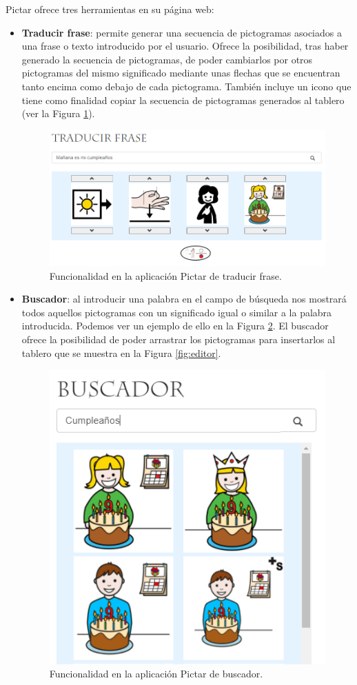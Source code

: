 Pictar ofrece tres herramientas en su página web:
\begin{itemize}
	\item \textbf{Traducir frase}: permite generar una secuencia de pictogramas asociados a una frase o texto introducido por el usuario. Ofrece la posibilidad, tras haber generado la secuencia de pictogramas, de poder cambiarlos por otros pictogramas del mismo significado mediante unas flechas que se encuentran tanto encima como debajo de cada pictograma. También incluye un icono que tiene como finalidad copiar la secuencia de pictogramas generados al tablero (ver la Figura \ref{fig:traducirfrase}).
	
	\begin{figure}[h!]
		\centering
		\includegraphics[width=0.7\linewidth]{Imagenes/Bitmap/TraducirFrase}
		\caption{Funcionalidad en la aplicación Pictar de traducir frase.}
		\label{fig:traducirfrase}
	\end{figure}

	\item \textbf{Buscador}: al introducir una palabra en el campo de búsqueda nos mostrará todos aquellos pictogramas con un significado igual o similar a la palabra introducida. Podemos ver un ejemplo de ello en la Figura \ref{fig:buscador}. El buscador ofrece la posibilidad de poder arrastrar los pictogramas para insertarlos al tablero que se muestra en la Figura \ref{fig:editor}.
	
	\begin{figure}[h!]
		\centering
		\includegraphics[width=0.5\linewidth]{Imagenes/Bitmap/buscador}
		\caption{Funcionalidad en la aplicación Pictar de buscador.}
		\label{fig:buscador}
	\end{figure}
	

\end{itemize}
